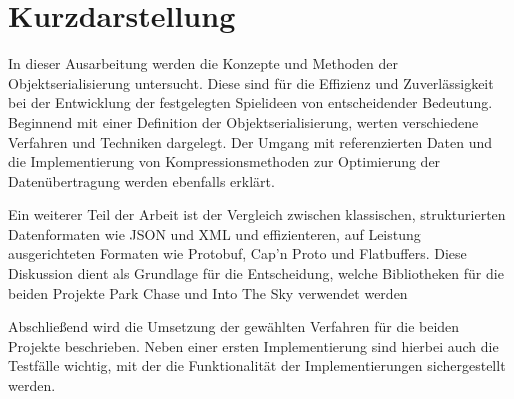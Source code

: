 \thispagestyle{empty}
\section*{Kurzdarstellung}
\label{sec:kurzdarstellung}
    
In dieser Ausarbeitung werden die Konzepte und Methoden der Objektserialisierung untersucht. Diese sind für die Effizienz und Zuverlässigkeit bei der Entwicklung der festgelegten Spielideen von entscheidender Bedeutung. Beginnend mit einer Definition der Objektserialisierung, werten verschiedene Verfahren und Techniken dargelegt. Der Umgang mit referenzierten Daten und die Implementierung von Kompressionsmethoden zur Optimierung der Datenübertragung werden ebenfalls erklärt.

Ein weiterer Teil der Arbeit ist der Vergleich zwischen klassischen, strukturierten Datenformaten wie JSON und XML und effizienteren, auf Leistung ausgerichteten Formaten wie Protobuf, Cap’n Proto und Flatbuffers. Diese Diskussion dient als Grundlage für die Entscheidung, welche Bibliotheken für die beiden Projekte Park Chase und Into The Sky verwendet werden

Abschließend wird die Umsetzung der gewählten Verfahren für die beiden Projekte beschrieben. Neben einer ersten Implementierung sind hierbei auch die Testfälle wichtig, mit der die Funktionalität der Implementierungen sichergestellt werden.

